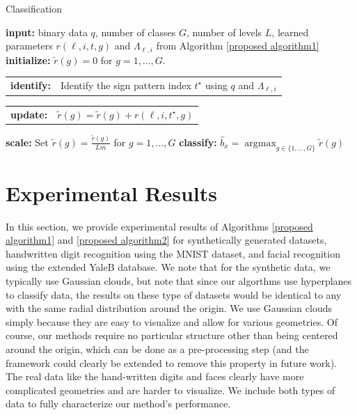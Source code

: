 \documentclass[twoside,11pt]{article}
\DeclareMathOperator*{\argmax}{arg max}
\newcommand{\GamLi}[2]{\Lambda_{#1,#2}}  %
\newcommand{\edit}[1]{{{#1}}}
\begin{document}
\begin{algorithm}[ht]
\caption{Classification} 
\label{proposed algorithm2}
\begin{algorithmic}
%
\STATE \textbf{input:} binary data $q$, number of classes $G$, number of \edit{level}s $L$, learned parameters $r(\ell,i,t,g)$ and $\GamLi{\ell}{i}$ from Algorithm \ref{proposed algorithm1}
\STATE 
%
\STATE \textbf{initialize:} $\tilde{r}(g) = 0$ for $g = 1,\dots,G$.
%
%
\STATE
\begin{tabular}{ll}
\textbf{identify:} & Identify the \edit{sign pattern index $t^\star$ using $q$ and $\Lambda_{\ell,i}$} \\%
\end{tabular}
\STATE
\begin{tabular}{ll}
\textbf{update:} & $\tilde{r}(g) = \tilde{r}(g) + r(\ell,i,t^\star,g)$ \\
\end{tabular}
\ENDFOR
%
\ENDFOR
\STATE \textbf{scale:} Set $\tilde{r}(g) = \frac{\tilde{r}(g)}{Lm}$ for $g=1,\dots,G$ 
\STATE \textbf{classify:} $\widehat{b}_x = \argmax_{g\in\{1,\dots,G\}}\tilde{r}(g)$
\end{algorithmic}
\end{algorithm}


\section{Experimental Results}\label{section::experiments}
In this section, we provide experimental results of Algorithms \ref{proposed algorithm1} and \ref{proposed algorithm2} for synthetically generated datasets, handwritten digit recognition using the MNIST dataset, and facial recognition using the extended YaleB database. \edit{We note that for the synthetic data, we typically use Gaussian clouds, but note that since our algorthms use hyperplanes to classify data, the results on these type of datasets would be identical to any with the same radial distribution around the origin. We use Gaussian clouds simply because they are easy to visualize and allow for various geometries. Of course, our methods require no particular structure other than being centered around the origin, which can be done as a pre-processing step (and the framework could clearly be extended to remove this property in future work).  The real data like the hand-written digits and faces clearly have more complicated geometries and are harder to visualize. We include both types of data to fully characterize our method's performance.}
\end{document}
